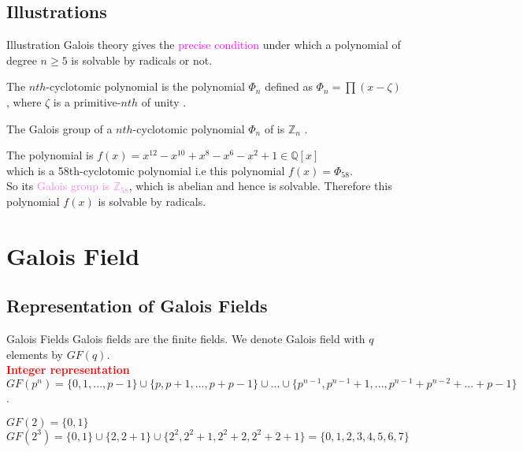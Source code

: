 \documentclass{beamer}
\begin{document}
\subsection{Illustrations}
\begin{frame}{Illustration}
Galois theory gives the \textcolor{magenta}{precise condition} under which a polynomial of degree \(n \geq 5\) is solvable by radicals or not.
\vspace{3mm}
\begin{definition}
 The \(nth\)-cyclotomic polynomial is the polynomial \({\Phi}_n\) defined as \({\Phi}_n= \prod {(x-\zeta)}\), where \(\zeta\) is a primitive-\(nth\) of unity \cite{galois}.
\end{definition}

\begin{theorem}[Theorem]
  The Galois group of a \(nth\)-cyclotomic polynomial \({\Phi}_n\) of is \(\mathbb{Z}_n\) \cite{galois}.
\end{theorem}

\vspace{4mm}
 \begin{tcolorbox}[colback=white, colframe=brown!80!black, title={\bfseries \color{white} Example}]
The polynomial is \textcolor{green!50!black}{\(f(x)=x^{12}-x^{10}+x^8-x^6-x^2+1 \in \mathbb{Q}[x]\)} \\
which is a 58th-cyclotomic polynomial \cite{galois} i.e this polynomial \(f(x)={\Phi}_{58}\).\\
So its \textcolor{violet}{Galois group is \(\mathbb{Z}_{58}\)}, which is abelian and hence is solvable. Therefore this polynomial \(f(x)\) is solvable by radicals.
\end{tcolorbox}
\end{frame}

\section{Galois Field}
\subsection{Representation of Galois Fields}
\begin{frame}{Galois Fields}
  Galois fields are the finite fields. We denote Galois field with \(q\) elements by \(GF(q)\).\\[4mm]

\textcolor{red}{\textbf{Integer representation}}\\[2mm]
\(GF(p^n)=\{0,1,...,p-1\} \cup \{p,p+1,...,p+p-1\} \cup ... \cup \{p^{n-1},p^{n-1}+1,...,p^{n-1}+p^{n-2}+...+p-1\}\) \cite{galois}.
\vspace{5mm}

\begin{example}[Example]
    \(GF(2)=\{0,1\}\)\\
    \(GF(2^3)=\{0,1\} \cup \{2,2+1\} \cup \{2^2,2^2+1,2^2+2,2^2+2+1\}=\{0,1,2,3,4,5,6,7\}\)
\end{example}
\end{frame}
\end{document}
